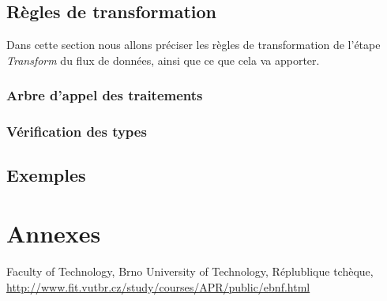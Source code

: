 \documentclass[french]{article}
\begin{document}
			\subsection{Règles de transformation}
			\label{subsec:regles-de-transformation}
			Dans cette section nous allons préciser les règles de transformation de l'étape \textit{Transform} du flux de données, ainsi que ce que cela va apporter.
			
			\subsubsection{Arbre d'appel des traitements}
			\label{subsubsec:arbre-d-appel-des-traitements}
			
			\subsubsection{Vérification des types}
			\label{subsubsec:verification-des-types}
			
			\subsection{Exemples}
	
	\section{Annexes}
	
	\begin{thebibliography}{9}
		Faculty of Technology, Brno University of Technology, Réplublique tchèque,\\ \url{http://www.fit.vutbr.cz/study/courses/APR/public/ebnf.html}
	\end{thebibliography}			
\end{document}
